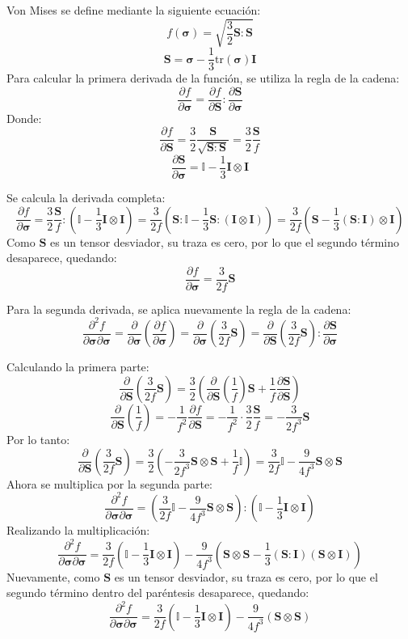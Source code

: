 \documentclass[12pt]{article}
\begin{document}
Von Mises se define mediante la siguiente ecuación:
\[ f(\pmb{\sigma}) = \sqrt{\frac{3}{2}\pmb{S}:\pmb{S}}\]
\[ \pmb{S} = \pmb{\sigma} - \frac{1}{3}\text{tr}(\pmb{\sigma})\pmb{I} \]
Para calcular la primera derivada de la función, se utiliza la regla de la cadena:
\[ \frac{\partial f}{\partial \pmb{\sigma}} = \frac{\partial f}{\partial \pmb{S}} : \frac{\partial \pmb{S}}{\partial \pmb{\sigma}} \]
Donde:
\[ \frac{\partial f}{\partial \pmb{S}} = \frac{3}{2}\frac{\pmb{S}}{\sqrt{\pmb{S}:\pmb{S}}} = \frac{3}{2}\frac{\pmb{S}}{f} \]
\[ \frac{\partial \pmb{S}}{\partial \pmb{\sigma}} = \mathbb{I} - \frac{1}{3}\pmb{I} \otimes \pmb{I} \]

Se calcula la derivada completa:
\[ \frac{\partial f}{\partial \pmb{\sigma}} = \frac{3}{2}\frac{\pmb{S}}{f} : \left(\mathbb{I} - \frac{1}{3}\pmb{I} \otimes \pmb{I}\right) = \frac{3}{2f}\left(\pmb{S}:\mathbb{I} - \frac{1}{3}\pmb{S}:(\pmb{I} \otimes \pmb{I})\right) = \frac{3}{2f}\left(\pmb{S} - \frac{1}{3}(\pmb{S}:\pmb{I}) \otimes \pmb{I}\right)\]
Como \(\pmb{S}\) es un tensor desviador, su traza es cero, por lo que el segundo término desaparece, quedando:
\[ \frac{\partial f}{\partial \pmb{\sigma}} = \frac{3}{2f}\pmb{S} \]

Para la segunda derivada, se aplica nuevamente la regla de la cadena:
\[ \frac{\partial^2 f}{\partial \pmb{\sigma} \partial \pmb{\sigma}} = \frac{\partial}{\partial \pmb{\sigma}}\left(\frac{\partial f}{\partial \pmb{\sigma}}\right) = \frac{\partial}{\partial \pmb{\sigma}}\left(\frac{3}{2f}\pmb{S}\right) = \frac{\partial}{\partial \pmb{S}}\left(\frac{3}{2f}\pmb{S}\right): \frac{\partial\pmb{S}}{\partial \pmb{\sigma}} \]

Calculando la primera parte:
\[ \frac{\partial}{\partial \pmb{S}}\left(\frac{3}{2f}\pmb{S}\right) = \frac{3}{2}\left(\frac{\partial}{\partial \pmb{S}}\left(\frac{1}{f}\right)\pmb{S} + \frac{1}{f}\frac{\partial \pmb{S}}{\partial \pmb{S}}\right) \]
\[ \frac{\partial}{\partial \pmb{S}}\left(\frac{1}{f}\right) = -\frac{1}{f^2}\frac{\partial f}{\partial \pmb{S}} = -\frac{1}{f^2}\cdot \frac{3}{2}\frac{\pmb{S}}{f} = -\frac{3}{2f^3}\pmb{S} \]
Por lo tanto:
\[ \frac{\partial}{\partial \pmb{S}}\left(\frac{3}{2f}\pmb{S}\right) = \frac{3}{2}\left(-\frac{3}{2f^3}\pmb{S} \otimes \pmb{S} + \frac{1}{f}\mathbb{I}\right) = \frac{3}{2f}\mathbb{I} - \frac{9}{4f^3}\pmb{S} \otimes \pmb{S} \]
Ahora se multiplica por la segunda parte:
\[ \frac{\partial^2 f}{\partial \pmb{\sigma} \partial \pmb{\sigma}} = \left(\frac{3}{2f}\mathbb{I} - \frac{9}{4f^3}\pmb{S} \otimes \pmb{S}\right) : \left(\mathbb{I} - \frac{1}{3}\pmb{I} \otimes \pmb{I}\right) \]
Realizando la multiplicación:
\[ \frac{\partial^2 f}{\partial \pmb{\sigma} \partial \pmb{\sigma}} = \frac{3}{2f}\left(\mathbb{I} - \frac{1}{3}\pmb{I} \otimes \pmb{I}\right) - \frac{9}{4f^3}\left(\pmb{S} \otimes \pmb{S} - \frac{1}{3}(\pmb{S}:\pmb{I})\left(\pmb{S} \otimes \pmb{I}\right)\right) \]
Nuevamente, como \(\pmb{S}\) es un tensor desviador, su traza es cero, por lo que el segundo término dentro del paréntesis desaparece, quedando:
\[ \frac{\partial^2 f}{\partial \pmb{\sigma} \partial \pmb{\sigma}} = \frac{3}{2f}\left(\mathbb{I} - \frac{1}{3}\pmb{I} \otimes \pmb{I}\right) - \frac{9}{4f^3}\left(\pmb{S} \otimes \pmb{S}\right) \]
\end{document}
